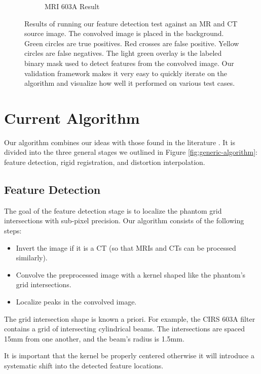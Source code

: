 \documentclass[12pt]{article}
\begin{document}
\begin{figure}
\begin{subfigure}[b]{0.48\textwidth}
        \caption{MRI 603A Result}
        \label{fig:testing-feature-detection_2}
    \end{subfigure}
    \caption{Results of running our feature detection test against an MR and CT source image.  The convolved image is placed in the background.  Green circles are true positives.  Red crosses are false positive.  Yellow circles are false negatives.  The light green overlay is the labeled binary mask used to detect features from the convolved image.  Our validation framework makes it very easy to quickly iterate on the algorithm and visualize how well it performed on various test cases.}
    \label{fig:feature-detection-run}
\end{figure}

\section{Current Algorithm}

Our algorithm combines our ideas with those found in the literature \cite{stanescu2010,baldwin2007}.  It is divided into the three general stages we outlined in Figure \ref{fig:generic-algorithm}: feature detection, rigid registration, and distortion interpolation.

\subsection{Feature Detection}

The goal of the feature detection stage is to localize the phantom grid intersections with sub-pixel precision.  Our algorithm consists of the following steps:

\begin{itemize}
    \item Invert the image if it is a CT (so that MRIs and CTs can be processed similarly).
    \item Convolve the preprocessed image with a kernel shaped like the phantom's grid intersections.
    \item Localize peaks in the convolved image.
\end{itemize}

The grid intersection shape is known a priori.  For example, the CIRS 603A filter contains a grid of intersecting cylindrical beams.  The intersections are spaced 15mm from one another, and the beam's radius is 1.5mm.

It is important that the kernel be properly centered otherwise it will introduce a systematic shift into the detected feature locations.
\end{document}
